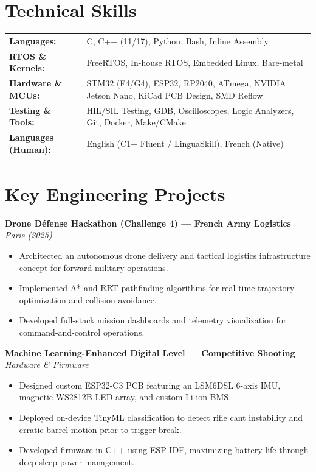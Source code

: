 \documentclass[10pt,a4paper]{article}
\begin{document}
\section{Technical Skills}
\small
\begin{tabularx}{\textwidth}{@{}ll@{}}
    \textbf{Languages:} & C, C++ (11/17), Python, Bash, Inline Assembly \\
    \textbf{RTOS \& Kernels:} & FreeRTOS, In-house RTOS, Embedded Linux, Bare-metal \\
    \textbf{Hardware \& MCUs:} & STM32 (F4/G4), ESP32, RP2040, ATmega, NVIDIA Jetson Nano, KiCad PCB Design, SMD Reflow \\
    \textbf{Testing \& Tools:} & HIL/SIL Testing, GDB, Oscilloscopes, Logic Analyzers, Git, Docker, Make/CMake \\
    \textbf{Languages (Human):} & English (C1+ Fluent / LinguaSkill), French (Native) \\
\end{tabularx}

\section{Key Engineering Projects}

\textbf{Drone Défense Hackathon (Challenge 4) --- French Army Logistics} \hfill \textit{Paris (2025)}
\begin{itemize}
    \item Architected an autonomous drone delivery and tactical logistics infrastructure concept for forward military operations.
    \item Implemented A* and RRT pathfinding algorithms for real-time trajectory optimization and collision avoidance.
    \item Developed full-stack mission dashboards and telemetry visualization for command-and-control operations.
\end{itemize}

\vspace{2pt}
\textbf{Machine Learning-Enhanced Digital Level --- Competitive Shooting} \hfill \textit{Hardware \& Firmware}
\begin{itemize}
    \item Designed custom ESP32-C3 PCB featuring an LSM6DSL 6-axis IMU, magnetic WS2812B LED array, and custom Li-ion BMS.
    \item Deployed on-device TinyML classification to detect rifle cant instability and erratic barrel motion prior to trigger break.
    \item Developed firmware in C++ using ESP-IDF, maximizing battery life through deep sleep power management.
\end{itemize}
\end{document}
